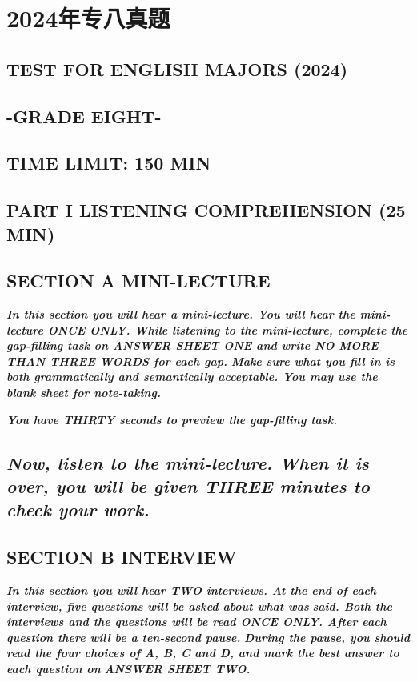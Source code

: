 \documentclass[UTF8,11pt]{ctexart}
\begin{document}
\section*{2024年专八真题}
\subsection*{\textbf{TEST} \textbf{FOR} \textbf{ENGLISH} \textbf{MAJORS (2024)}}


\subsection*{\textbf{-GRADE EIGHT-}}


\subsection*{\textbf{TIME LIMIT: 150 MIN}}


\subsection*{\textbf{PART I LISTENING COMPREHENSION (25 MIN})}


\subsection*{\textbf{SECTION A MINI-LECTURE}}


\textbf{\textit{In this section you will hear a mini-lecture. You will hear the mini-lecture ONCE ONLY. While listening to the mini-lecture, complete the gap-filling task on ANSWER SHEET ONE and write NO MORE THAN THREE WORDS for each gap.}} \textbf{\textit{Make sure what you fill in is both grammatically and semantically acceptable. You may use the blank sheet for note-taking.}}


\textbf{\textit{You have THIRTY seconds to preview the gap-filling task.}}


\subsection*{\textbf{\textit{Now, listen to the mini-lecture. When it is over, you will be given THREE minutes to check your work.}}}


\subsection*{\textbf{SECTION B INTERVIEW}}


\textbf{\textit{In this section you will hear TWO interviews. At the end of each interview, five questions will be asked about what was}} \textbf{\textit{said. Both the interviews and the questions will be read ONCE ONLY. After each question there will be a ten-second pause.}} \textbf{\textit{During the pause, you should read the four choices of A, B, C and D, and mark the best answer to each question on}} \textbf{\textit{ANSWER SHEET TWO.}}
\end{document}
